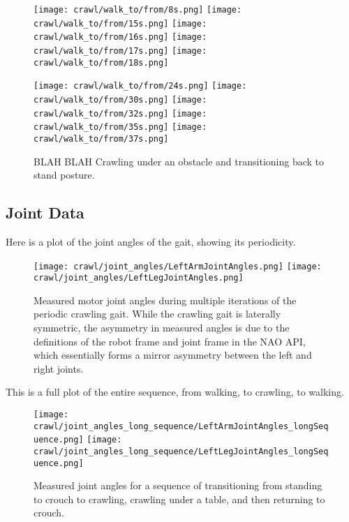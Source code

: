 \begin{figure}
  \centerline{
    \texttt{[image: crawl/walk\_to/from/8s.png]}
    \texttt{[image: crawl/walk\_to/from/15s.png]}
    \texttt{[image: crawl/walk\_to/from/16s.png]}
    \texttt{[image: crawl/walk\_to/from/17s.png]}
    \texttt{[image: crawl/walk\_to/from/18s.png]}
  }
  \centerline{
    \texttt{[image: crawl/walk\_to/from/24s.png]}
    \texttt{[image: crawl/walk\_to/from/30s.png]}
    \texttt{[image: crawl/walk\_to/from/32s.png]}
    \texttt{[image: crawl/walk\_to/from/35s.png]}
    \texttt{[image: crawl/walk\_to/from/37s.png]}
  }
  \caption{BLAH BLAH Crawling under an obstacle and transitioning back to stand posture.}
  \label{fig:nao_crawl4}
\end{figure}

\subsection{Joint Data}
Here is a plot of the joint angles of the gait, showing its periodicity.

\begin{figure}
  \centerline{
    \texttt{[image: crawl/joint\_angles/LeftArmJointAngles.png]}
    \texttt{[image: crawl/joint\_angles/LeftLegJointAngles.png]}
  }
  \caption{Measured motor joint angles during multiple iterations of the periodic crawling gait.
           While the crawling gait is laterally symmetric, the asymmetry in measured angles is due to the
           definitions of the robot frame and joint frame in the NAO API, which essentially forms a mirror
           asymmetry between the left and right joints.}
  \label{fig:nao_joint_angles1}
\end{figure}

This is a full plot of the entire sequence, from walking, to crawling, to walking.

\begin{figure}
  \centerline{
    \texttt{[image: crawl/joint\_angles\_long\_sequence/LeftArmJointAngles\_longSequence.png]}
    \texttt{[image: crawl/joint\_angles\_long\_sequence/LeftLegJointAngles\_longSequence.png]}
  }
  \caption{Measured joint angles for a sequence of transitioning from standing to crouch to crawling,
           crawling under a table, and then returning to crouch.}
  \label{fig:nao_joint_angles_long_seq}
\end{figure}

